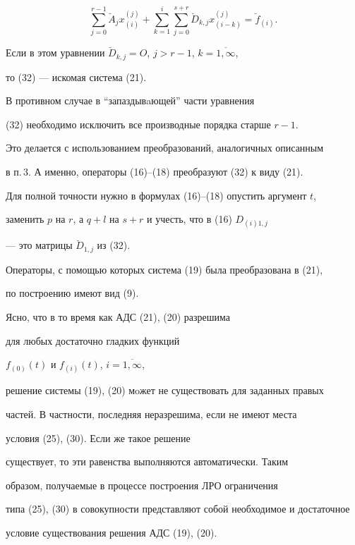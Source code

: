 \begin{pf}
\begin{equation}
\sum_{j=0}^{r-1}{\breve A_{j}x_{(i)}^{(j)}} +


\sum_{k=1}^{i}


{\sum_{j=0}^{s+r}{\breve D_{k,j}x_{(i-k)}^{(j)}}}=


\breve f_{(i)}.


\end{equation}





Если в этом уравнении $\breve D_{k,j}=O$, $j>r-1$, $k=\overline{1, \infty}$, 


то (32) --- искомая система (21).





В противном случае в ``запаздывaющей'' части уравнения


(32) необходимо исключить все производные порядка старше $r-1$.


Это делается с использованием преобразований, аналогичных описанным


в п.\,3. А именно, операторы (16)--(18) преобразуют (32) к виду (21).


Для полной точности нужно в формулах (16)--(18) опустить аргумент $t$,


заменить $p$ на $r$, а $q+l$ на $s+r$ и учесть, что в (16) $D_{(i)1,j}$


--- это матрицы $\breve D_{1,j}$ из (32). 





Операторы, с помощью которых система (19) была преобразована в (21),


по построению имеют вид (9).


\end{pf}


 


\begin{note}


Ясно, что в то время как АДС (21), (20) разрешима


для любых достаточно гладких функций


$f_{(0)}(t)$ и $f_{(i)}(t)$, $i=\overline{1,\infty}$, 


решение системы (19), (20) мoжет не существовать для заданных правых


частей. В частности, последняя неразрешима, если не имеют места


условия (25), (30). Если же такое решение


существует, то эти равенства выполняются автоматически. Таким


образом, получаемые в процессе построения ЛРО ограничения


 типа (25), (30) в совокупности представляют собой необходимое и достаточное 


условие существования решения АДС (19), (20).


\end{note}








